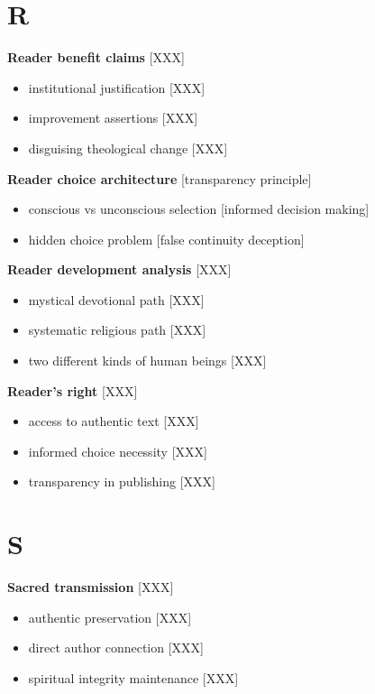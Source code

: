 \documentclass[11pt,twoside]{book}
\begin{document}
\section*{R}
\label{sec:org184a374}

\textbf{\textbf{Reader benefit claims}} {[}XXX]
\begin{itemize}
\item institutional justification [XXX]
\item improvement assertions [XXX]
\item disguising theological change [XXX]
\end{itemize}

\textbf{\textbf{Reader choice architecture}} {[}transparency principle]
\begin{itemize}
\item conscious vs unconscious selection [informed decision making]
\item hidden choice problem [false continuity deception]
\end{itemize}

\textbf{\textbf{Reader development analysis}} {[}XXX]
\begin{itemize}
\item mystical devotional path [XXX]
\item systematic religious path [XXX]
\item two different kinds of human beings [XXX]
\end{itemize}

\textbf{\textbf{Reader's right}} {[}XXX]
\begin{itemize}
\item access to authentic text [XXX]
\item informed choice necessity [XXX]
\item transparency in publishing [XXX]
\end{itemize}
\section*{S}
\label{sec:orgf3cd4d7}

\textbf{\textbf{Sacred transmission}} {[}XXX]
\begin{itemize}
\item authentic preservation [XXX]
\item direct author connection [XXX]
\item spiritual integrity maintenance [XXX]
\end{itemize}
\end{document}
